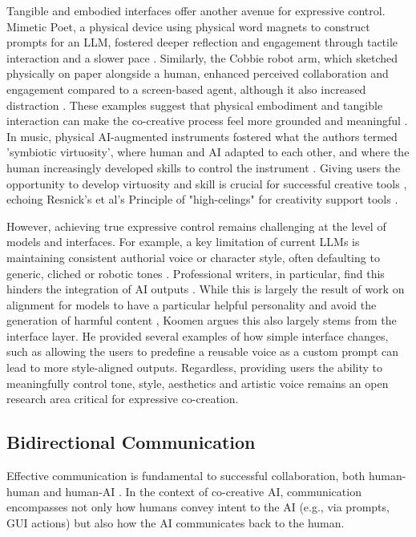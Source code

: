 Tangible and embodied interfaces offer another avenue for expressive control. Mimetic Poet, a physical device using physical word magnets to construct prompts for an LLM, fostered deeper reflection and engagement through tactile interaction and a slower pace \cite{McCormack2024-gv}. Similarly, the Cobbie robot arm, which sketched physically on paper alongside a human, enhanced perceived collaboration and engagement compared to a screen-based agent, although it also increased distraction \cite{Lin2020-ji}. These examples suggest that physical embodiment and tangible interaction can make the co-creative process feel more grounded and meaningful \cite{McCormack2024-gv, Lin2020-ji}. In music, physical AI-augmented instruments fostered what the authors termed 'symbiotic virtuosity', where human and AI adapted to each other, and where the human increasingly developed skills to control the instrument \cite{Blanchard2024-jz}. Giving users the opportunity to develop virtuosity and skill is crucial for successful creative tools \cite{Lee2024-tu}, echoing Resnick's et al's Principle of "high-celings" for creativity support tools \cite{Resnick2005-fs}. 

However, achieving true expressive control remains challenging at the level of models and interfaces. For example, a key limitation of current LLMs is maintaining consistent authorial voice or character style, often defaulting to generic, cliched or robotic tones \cite{Ippolito2022-mf, Yuan2022-kb, Chakrabarty2024-ov}. Professional writers, in particular, find this hinders the integration of AI outputs \cite{Ippolito2022-mf, Grigis2024-pf}. While this is largely the result of work on alignment for models to have a particular helpful personality and avoid the generation of harmful content \cite{Anthropic2024-ne, Ouyang2022-af, Bai2022-ec}, Koomen \cite{Koomen2025-eu} argues this also largely stems from the interface layer. He provided several examples of how simple interface changes, such as allowing the users to predefine a reusable voice as a custom prompt can lead to more style-aligned outputs. Regardless, providing users the ability to meaningfully control tone, style, aesthetics and artistic voice remains an open research area critical for expressive co-creation.

\subsection{Bidirectional Communication}

Effective communication is fundamental to successful collaboration, both human-human and human-AI \cite{Mamykina2002-lm, Rezwana2022-gg}. In the context of co-creative AI, communication encompasses not only how humans convey intent to the AI (e.g., via prompts, GUI actions) but also how the AI communicates back to the human.

